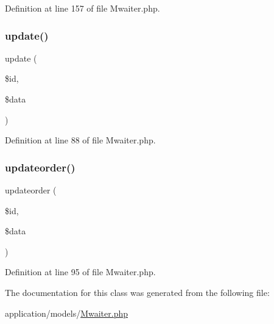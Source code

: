 Definition at line 157 of file Mwaiter.\+php.

\mbox{\label{class_mwaiter_acaa59d49766017d95ff8c84597aa88b8}} 
\subsubsection{\texorpdfstring{update()}{update()}}
{\footnotesize\ttfamily update (\begin{DoxyParamCaption}\item[{}]{\$id,  }\item[{}]{\$data }\end{DoxyParamCaption})}



Definition at line 88 of file Mwaiter.\+php.

\mbox{\label{class_mwaiter_a88ac8aa31ee6385755cd8de23c3992cb}} 
\subsubsection{\texorpdfstring{updateorder()}{updateorder()}}
{\footnotesize\ttfamily updateorder (\begin{DoxyParamCaption}\item[{}]{\$id,  }\item[{}]{\$data }\end{DoxyParamCaption})}



Definition at line 95 of file Mwaiter.\+php.



The documentation for this class was generated from the following file\+:\begin{DoxyCompactItemize}
\item 
application/models/\mbox{\hyperlink{_mwaiter_8php}{Mwaiter.\+php}}\end{DoxyCompactItemize}
